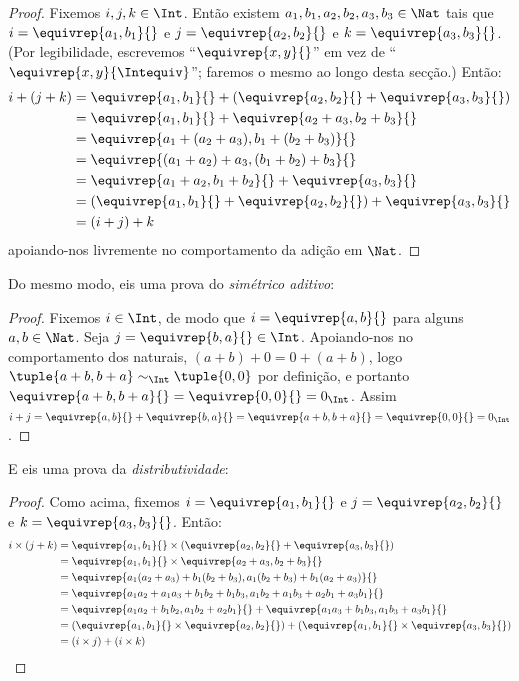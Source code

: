 \documentclass[../../../include/open-logic-section]{subfiles}
\begin{document}
\begin{proof} 
Fixemos $i, j, k \in \Int$. Então existem $a_1, b_1, a_2, b_2, a_3, b_3 \in
\Nat$ tais que $i = \equivrep{a_1, b_1}{}$ e $j =
\equivrep{a_2,b_2}{}$ e $k = \equivrep{a_3, b_3}{}$. (Por legibilidade, escrevemos
``$\equivrep{x, y}{}$'' em vez de ``$\equivrep{x, y}{\Intequiv}$''; faremos o
mesmo ao longo desta secção.) Então:
\begin{align*}
	i + (j + k) &= \equivrep{a_1, b_1}{}+(\equivrep{a_2, b_2}{} + \equivrep{a_3, b_3}{}) \\
	&= \equivrep{a_1,  b_1}{} + \equivrep{a_2+a_3, b_2+b_3}{}\\
	&= \equivrep{a_1 + (a_2 + a_3), b_1 + (b_2 + b_3)}{}\\
	&= \equivrep{(a_1 + a_2) + a_3, (b_1 + b_2) + b_3}{}\\
	&= \equivrep{a_1 + a_2, b_1 + b_2}{} + \equivrep{a_3, b_3}{}\\
	&= (\equivrep{a_1, b_1}{} + \equivrep{a_2, b_2}{}) + \equivrep{a_3, b_3}{}\\
	&= (i+j) + k
\end{align*}
apoiando-nos livremente no comportamento da adição em $\Nat$.
\end{proof}

Do mesmo modo, eis uma prova do \emph{simétrico aditivo}:

\begin{proof}
Fixemos $i \in \Int$, de modo que $i = \equivrep{a,b}{}$ para alguns $a,b \in
\Nat$. Seja $j = \equivrep{b,a}{} \in \Int$. Apoiando-nos no comportamento dos
naturais, $(a+b) + 0 = 0 + (a+b)$, logo $\tuple{a+b, b+a} \sim_\Int \tuple{0,0}$
por definição, e portanto $\equivrep{a+b, b+a}{} = \equivrep{0, 0}{} = 0_\Int$.
Assim $i + j =
\equivrep{a,b}{}+\equivrep{b,a}{}=\equivrep{a+b, b+a}{}= \equivrep{0,
0}{} = 0_\Int$.
\end{proof}

E eis uma prova da \emph{distributividade}:

\begin{proof}
Como acima, fixemos $i = \equivrep{a_1, b_1}{}$ e $j =
\equivrep{a_2,b_2}{}$ e $k = \equivrep{a_3, b_3}{}$. Então:
\begin{align*}
	i \times (j + k) 
	&= \equivrep{a_1, b_1}{} \times (\equivrep{a_2,b_2}{} + \equivrep{a_3, b_3}{})\\
	&= \equivrep{a_1, b_1}{} \times \equivrep{a_2 + a_3,b_2+b_3}{}\\
	&= \equivrep{a_1  (a_2 + a_3) + b_1  (b_2+b_3), a_1  (b_2 + b_3) + b_1 (a_2 + a_3)}{}\\
	&= \equivrep{a_1 a_2 + a_1a_3 + b_1 b_2+b_1b_3, a_1 b_2 + a_1b_3 + a_2b_1 + a_3b_1}{}\\		
	&= \equivrep{a_1a_2 + b_1b_2, a_1b_2 + a_2b_1}{} + \equivrep{a_1a_3 + b_1b_3, a_1b_3 + a_3b_1}{}\\
	&= (\equivrep{a_1, b_1}{} \times \equivrep{a_2,b_2}{}) + (\equivrep{a_1, b_1}{} \times  \equivrep{a_3, b_3}{})\\
	&= (i \times j) + (i \times k)
\end{align*}
\end{proof}
\end{document}
